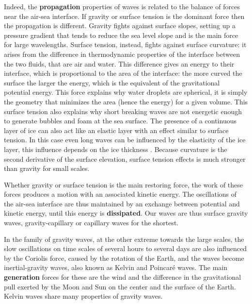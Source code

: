 Indeed, the \textbf{propagation} properties of waves is related to the balance of forces near the air-sea interface. If gravity or surface tension is the dominant force then the propagation is different.
Gravity fights against surface slopes, setting up a pressure gradient that tends to reduce the sea level slope and is the main force 
for large wavelengths. Surface tension, instead, fights against surface curvature:
it arises from the difference in thermodynamic properties of the interface between the two fluids, that are air and water. 
This difference gives an energy to their interface, which is proportional to the area of the interface: the more curved the surface the 
larger the energy, which is the equivalent of the gravitational potential energy. This force explains 
why water droplets are spherical, it is simply the geometry that minimizes the area (hence the energy) for a given volume. 
This surface tension also explains why short breaking waves are not energetic enough to generate bubbles and foam at the sea surface. 
The presence of a continuous layer of ice can also act like an elastic layer with an effect similar to surface tension. In this case
even long waves can be influenced by the elasticity of the ice layer, this influence depends on the ice thickness \citep[e.g.][]{Squire&al.1995}. 
Because curvature is the second derivative of the surface elevation, surface tension effects is much stronger than gravity for small scales. 

Whether gravity or surface tension is the main restoring force, the work of these forces produces a motion with an associated kinetic energy. 
The oscillations of the air-sea interface are thus maintained by an exchange between potential and kinetic energy, 
until this energy is \textbf{dissipated}. Our waves are thus surface gravity waves, gravity-capillary or capillary waves for the shortest. 

In the family of gravity waves, at the other extreme towards the large scales, the slow oscillations on time scales of several hours to several days 
are also influenced by 
the Coriolis force, caused by the rotation of the Earth, and the waves become inertial-gravity waves, also known as Kelvin and Poincar{\'e}
waves. The main \textbf{generation} forces for these are the wind and the difference in the gravitational pull exerted by the Moon and Sun on the 
center and the surface of the Earth. Kelvin waves share many properties of gravity waves.

